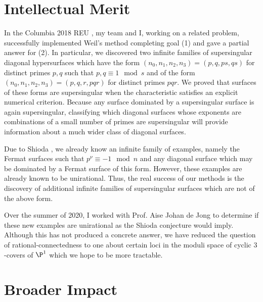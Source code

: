 \documentclass[12pt]{amsart}
\begin{document}
\section*{Intellectual Merit}

In the Columbia 2018 REU \cite{REU}, my team and I, working on a related problem, successfully implemented Weil's method completing goal (1) and gave a partial answer for (2). In particular, we discovered two infinite families of supersingular diagonal hypersurfaces which have the form $(n_0, n_1, n_2, n_3) = (p, q, ps, qs)$ for distinct primes $p,q$ such that $p,q \equiv 1 \mod s$ and of the form $(n_0, n_1, n_2, n_3) = (p, q, r, pqr)$ for distinct primes $pqr$. We proved that surfaces of these forms are supersingular when the characteristic satisfies an explicit numerical criterion. Because any surface dominated by a supersingular surface is again supersingular, classifying which diagonal surfaces whose exponents are combinations of a small number of primes are supersingular will provide information about a much wider class of diagonal surfaces.  
\par
Due to Shioda \cite{shioda_on_fermat}, we already know an infinite family of examples, namely the Fermat surfaces such that $p^\nu \equiv - 1 \mod n$ and any diagonal surface which may be dominated by a Fermat surface of this form. However, these examples are already known to be unirational. Thus, the real success of our methods is the discovery of additional infinite families of supersingular surfaces which are not of the above form. 
\par
Over the summer of 2020, I worked with Prof. Aise Johan de Jong to determine if these new examples are unirational as the Shioda conjecture would imply. Although this has not produced a concrete answer, we have reduced the question of rational-connectedness to one about certain loci in the moduli space of cyclic $3$-covers of $\P^1$ which we hope to be more tractable.

\section*{Broader Impact}
\end{document}
